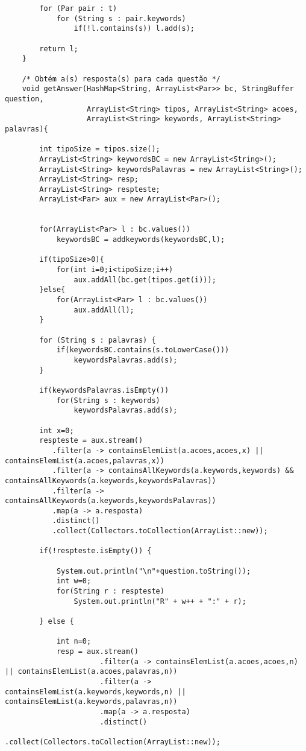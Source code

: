 \begin{changemargin}{-3cm}{0cm}
\begin{verbatim}
        for (Par pair : t)
            for (String s : pair.keywords)
                if(!l.contains(s)) l.add(s);
        
        return l;
    }
     
    /* Obtém a(s) resposta(s) para cada questão */
    void getAnswer(HashMap<String, ArrayList<Par>> bc, StringBuffer question,
                   ArrayList<String> tipos, ArrayList<String> acoes, 
                   ArrayList<String> keywords, ArrayList<String> palavras){
                   
        int tipoSize = tipos.size();
        ArrayList<String> keywordsBC = new ArrayList<String>();
        ArrayList<String> keywordsPalavras = new ArrayList<String>();
        ArrayList<String> resp;
        ArrayList<String> respteste;
        ArrayList<Par> aux = new ArrayList<Par>();

          
        for(ArrayList<Par> l : bc.values())
            keywordsBC = addkeywords(keywordsBC,l);

        if(tipoSize>0){
            for(int i=0;i<tipoSize;i++)
                aux.addAll(bc.get(tipos.get(i)));
        }else{
            for(ArrayList<Par> l : bc.values())
                aux.addAll(l);                        
        }  

        for (String s : palavras) {
            if(keywordsBC.contains(s.toLowerCase()))
                keywordsPalavras.add(s);
        }

        if(keywordsPalavras.isEmpty())
            for(String s : keywords)
                keywordsPalavras.add(s);
                    
        int x=0;
        respteste = aux.stream()
           .filter(a -> containsElemList(a.acoes,acoes,x) || containsElemList(a.acoes,palavras,x))
           .filter(a -> containsAllKeywords(a.keywords,keywords) && containsAllKeywords(a.keywords,keywordsPalavras))
           .filter(a -> containsAllKeywords(a.keywords,keywordsPalavras))
           .map(a -> a.resposta)
           .distinct()
           .collect(Collectors.toCollection(ArrayList::new));

        if(!respteste.isEmpty()) {

            System.out.println("\n"+question.toString());
            int w=0;
            for(String r : respteste)
                System.out.println("R" + w++ + ":" + r);

        } else {

            int n=0;
            resp = aux.stream()
                      .filter(a -> containsElemList(a.acoes,acoes,n) || containsElemList(a.acoes,palavras,n))
                      .filter(a -> containsElemList(a.keywords,keywords,n) || containsElemList(a.keywords,palavras,n))
                      .map(a -> a.resposta)
                      .distinct()
                      .collect(Collectors.toCollection(ArrayList::new));
    

\end{verbatim}
\end{changemargin}

